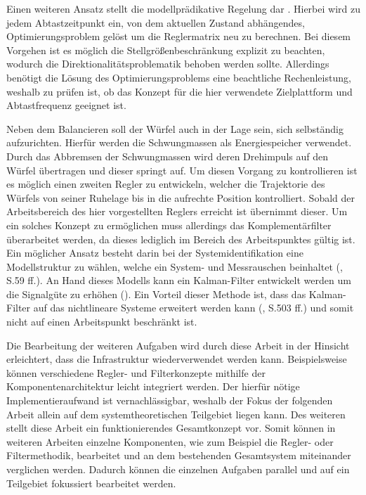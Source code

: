Einen weiteren Ansatz stellt die modellprädikative Regelung dar \cite{MPC}. Hierbei wird zu jedem Abtastzeitpunkt ein, von dem aktuellen Zustand abhängendes, Optimierungsproblem gelöst um die Reglermatrix neu zu berechnen. Bei diesem Vorgehen ist es möglich die Stellgrößenbeschränkung explizit zu beachten, wodurch die Direktionalitätsproblematik behoben werden sollte. Allerdings benötigt die Lösung des Optimierungsproblems eine beachtliche Rechenleistung, weshalb zu prüfen ist, ob das Konzept für die hier verwendete Zielplattform und Abtastfrequenz geeignet ist.

Neben dem Balancieren soll der Würfel auch in der Lage sein, sich selbständig aufzurichten. Hierfür werden die Schwungmassen als Energiespeicher verwendet. Durch das Abbremsen der Schwungmassen wird deren Drehimpuls auf den Würfel übertragen und dieser springt auf. Um diesen Vorgang zu kontrollieren ist es möglich einen zweiten Regler zu entwickeln, welcher die Trajektorie des Würfels von seiner Ruhelage bis in die aufrechte Position kontrolliert. Sobald der Arbeitsbereich des hier vorgestellten Reglers erreicht ist übernimmt dieser. Um ein solches Konzept zu ermöglichen muss allerdings das Komplementärfilter überarbeitet werden, da dieses lediglich im Bereich des Arbeitspunktes gültig ist. Ein möglicher Ansatz besteht darin  bei der Systemidentifikation eine Modellstruktur zu wählen, welche ein System- und Messrauschen beinhaltet (\cite{UnbehauenSysId}, S.59 ff.). An Hand dieses Modells kann ein Kalman-Filter entwickelt werden um die Signalgüte zu erhöhen (\cite{KalmanFilter}). Ein Vorteil dieser Methode ist, dass das Kalman-Filter auf das nichtlineare Systeme erweitert werden kann (\cite{AdamyNL}, S.503 ff.) und somit nicht auf einen Arbeitspunkt beschränkt ist.

Die Bearbeitung der weiteren Aufgaben wird durch diese Arbeit in der Hinsicht erleichtert, dass die Infrastruktur wiederverwendet werden kann. Beispielsweise können verschiedene Regler- und Filterkonzepte mithilfe der Komponentenarchitektur leicht integriert werden. Der hierfür nötige Implementieraufwand ist vernachlässigbar, weshalb der Fokus der folgenden Arbeit allein auf dem systemtheoretischen Teilgebiet liegen kann. Des weiteren stellt diese Arbeit ein funktionierendes Gesamtkonzept vor. Somit können in weiteren Arbeiten einzelne Komponenten, wie zum Beispiel die Regler- oder Filtermethodik, bearbeitet und an dem bestehenden Gesamtsystem miteinander verglichen werden. Dadurch können die einzelnen Aufgaben parallel und auf ein Teilgebiet fokussiert bearbeitet werden.